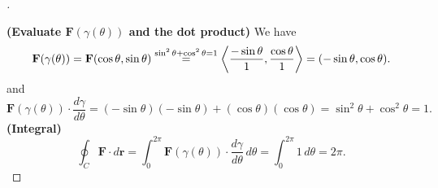 \documentclass[11pt,openany]{article}
\renewcommand{\vec}[1]{\mathbf{#1}}
\begin{document}
\begin{proof}[\sol]
\begin{center}
\begin{minipage}{.4\textwidth}
\begin{tikzpicture}[scale=.8]
	\end{tikzpicture}
	\end{minipage}
	\end{center}
	\textbf{(Evaluate $\textbf{F}(\gamma(\theta))$ and the dot product)}\; We have \[
	\vec{F}(\gamma(\theta)) = \vec{F}(\cos\theta,\sin\theta) \overset{\sin^2\theta+\cos^2\theta=1}{=} \Gen{\frac{-\sin \theta}{1}, \frac{\cos \theta}{1} }
	= (-\sin \theta, \cos \theta).
	\] and \[
	\vec{F}(\gamma(\theta)) \cdot \frac{d\gamma}{d\theta}
	= (-\sin \theta)(-\sin \theta) + (\cos \theta)(\cos \theta)
	= \sin^2 \theta + \cos^2 \theta = 1.
	\]
	\textbf{(Integral)} \[
	\oint_C \vec{F} \cdot d\vec{r}
	= \int_0^{2\pi} \vec{F}(\gamma(\theta)) \cdot\frac{d\gamma}{d\theta}\,d\theta
	= \int_0^{2\pi} 1\,d\theta = 2\pi.
	\]
\end{proof}

\newpage
\end{document}
